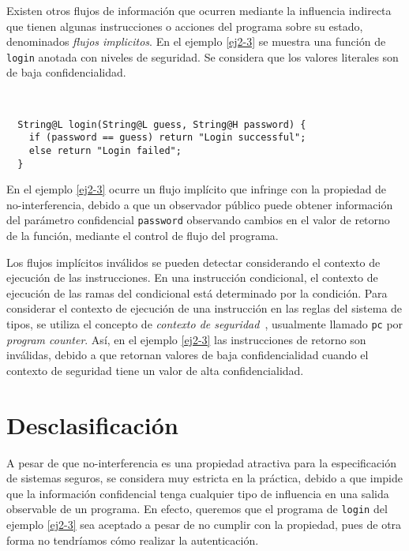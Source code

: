 Existen otros flujos de información que ocurren mediante la influencia indirecta que tienen algunas instrucciones o acciones del programa sobre su estado, denominados \emph{flujos implicitos}. En el ejemplo \ref{ej2-3} se muestra una función de \texttt{login} anotada con niveles de seguridad. Se considera que los valores literales son de baja confidencialidad.

\begin{ej} \ \\
  \normalfont
  \label{ej2-3}
\begin{lstlisting}
  String@L login(String@L guess, String@H password) {
    if (password == guess) return "Login successful";
    else return "Login failed";
  }
\end{lstlisting}
\end{ej}

En el ejemplo \ref{ej2-3} ocurre un flujo implícito que infringe con la propiedad de no-interferencia, debido a que un observador público puede obtener información del parámetro confidencial \texttt{password} observando cambios en el valor de retorno de la función, mediante el control de flujo del programa.

Los flujos implícitos inválidos se pueden detectar considerando el contexto de ejecución de las instrucciones. En una instrucción condicional, el contexto de ejecución de las ramas del condicional está determinado por la condición. Para considerar el contexto de ejecución de una instrucción en las reglas del sistema de tipos, se utiliza el concepto de \emph{contexto de seguridad}~\cite{pc}, usualmente llamado \texttt{pc} por \emph{program counter}. Así, en el ejemplo \ref{ej2-3} las instrucciones de retorno son inválidas, debido a que retornan valores de baja confidencialidad cuando el contexto de seguridad tiene un valor de alta confidencialidad.

\section{Desclasificación}
A pesar de que no-interferencia es una propiedad atractiva para la especificación de sistemas seguros, se considera muy estricta en la práctica, debido a que impide que la información confidencial tenga cualquier tipo de influencia en una salida observable de un programa. En efecto, queremos que el programa de \texttt{login} del ejemplo \ref{ej2-3} sea aceptado a pesar de no cumplir con la propiedad, pues de otra forma no tendríamos cómo realizar la autenticación.

